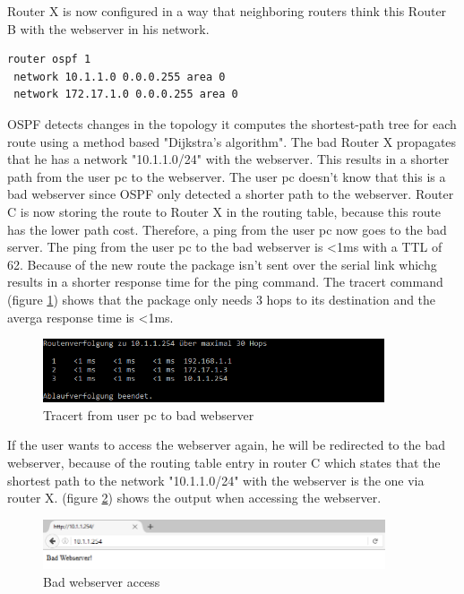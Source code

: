 Router X is now configured in a way that neighboring routers think this Router B with the webserver in his network. 

\begin{lstlisting}[caption={\ac{OSPF} configuration on router X},label={lst:ospfRouterX},language={}]
router ospf 1
 network 10.1.1.0 0.0.0.255 area 0
 network 172.17.1.0 0.0.0.255 area 0
\end{lstlisting}

\ac{OSPF} detects changes in the topology it computes the shortest-path tree for each route using a method based "Dijkstra's algorithm". The bad Router X propagates that he has a network "10.1.1.0/24" with the webserver. This results in a shorter path from the user pc to the webserver. The user pc doesn't know that this is a bad webserver since \ac{OSPF} only detected a shorter path to the webserver. Router C is now storing the route to Router X in the routing table, because this route has the lower path cost. Therefore, a ping from the user pc now goes to the bad server.
The ping from the user pc to the bad webserver is <1ms with a TTL of 62. Because of the new route the package isn't sent over the serial link whichg results in a shorter response time for the ping command. The tracert command (figure \ref{img:TracertBadWebserver}) shows that the package only needs 3 hops to its destination and the averga response time is <1ms.

\begin{figure}[H]
	\centering
	\includegraphics[width=0.9\textwidth]{img/TracertBadWebserver.png}
	\caption{Tracert from user pc to bad webserver}
	\label{img:TracertBadWebserver}
\end{figure}

If the user wants to access the webserver again, he will be redirected to the bad webserver, because of the routing table entry in router C which states that the shortest path to the network "10.1.1.0/24" with the webserver is the one via router X.
(figure \ref{img:BadWebserverScreenshot}) shows the output when accessing the webserver.

\begin{figure}[H]
	\centering
	\includegraphics[width=0.9\textwidth]{img/BadWebserverScreenshot.png}
	\caption{Bad webserver access}
	\label{img:BadWebserverScreenshot}
\end{figure}

